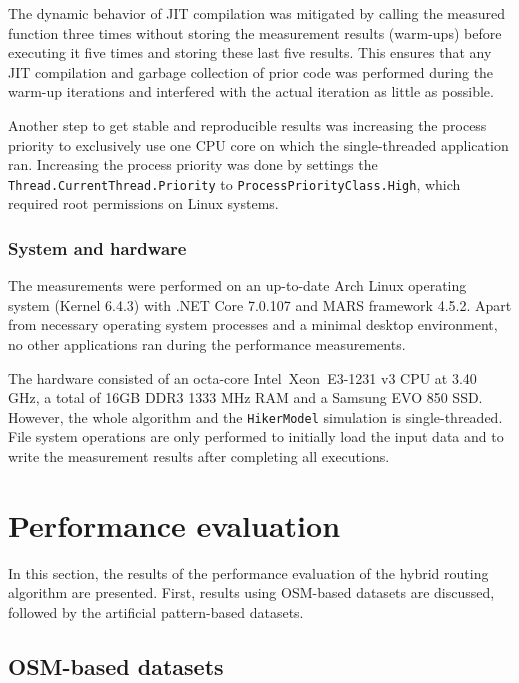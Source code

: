 			The dynamic behavior of JIT compilation was mitigated by calling the measured function three times without storing the measurement results (warm-ups) before executing it five times and storing these last five results.
			This ensures that any JIT compilation and garbage collection of prior code was performed during the warm-up iterations and interfered with the actual iteration as little as possible.
			
			Another step to get stable and reproducible results was increasing the process priority to exclusively use one CPU core on which the single-threaded application ran.
			Increasing the process priority was done by settings the \texttt{Thread.CurrentThread.Priority} to \texttt{ProcessPriorityClass.High}, which required root permissions on Linux systems.
		
		\subsubsection{System and hardware}
		
			The measurements were performed on an up-to-date Arch Linux operating system (Kernel 6.4.3) with .NET Core 7.0.107 and MARS framework 4.5.2.
			Apart from necessary operating system processes and a minimal desktop environment, no other applications ran during the performance measurements.
			
			The hardware consisted of an octa-core Intel\textregistered\ Xeon\textregistered\ E3-1231 v3 CPU at 3.40 GHz, a total of 16GB DDR3 1333 MHz RAM and a Samsung EVO 850 SSD.
			However, the whole algorithm and the \texttt{HikerModel} simulation is single-threaded.
			File system operations are only performed to initially load the input data and to write the measurement results after completing all executions.
	
\section{Performance evaluation}

	In this section, the results of the performance evaluation of the hybrid routing algorithm are presented.
	First, results using OSM-based datasets are discussed, followed by the artificial pattern-based datasets.

	\subsection{OSM-based datasets}
		
